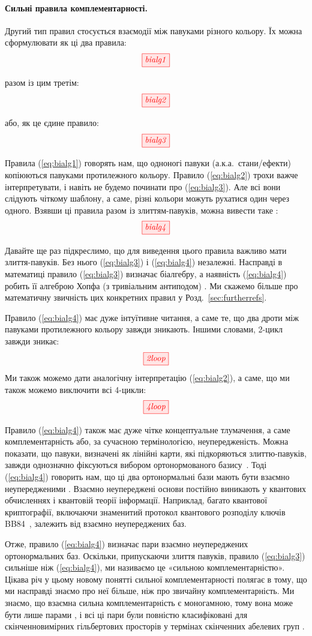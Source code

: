 \documentclass[11pt]{article}
\theoremstyle{definition}
\newcommand{\beq}{\begin{equation}}
\newcommand{\eeq}{\end{equation}\par\noindent}
\begin{document}
\paragraph{Сильні правила комплементарності.}  Другий тип правил стосується взаємодії між павуками різного кольору.
Їх можна сформулювати як ці два правила:  
\beq\label{eq:bialg1}
\tikzfig{bialg1} 
\eeq
разом із цим третім:
\beq\label{eq:bialg2}
\tikzfig{bialg2} 
\eeq 
або, як це єдине правило:
\beq\label{eq:bialg3}
\tikzfig{bialg3} 
\eeq
Правила (\ref{eq:bialg1}) говорять нам, що одноногі павуки (а.к.а.~стани/ефекти) копіюються павуками протилежного кольору. Правило (\ref{eq:bialg2}) трохи важче інтерпретувати, і навіть не будемо починати про (\ref{eq:bialg3}).
Але всі вони слідують чіткому шаблону, а саме, різні кольори можуть рухатися один через одного. Взявши ці правила разом із злиттям-павуків, можна вивести таке \cite{CD2}:
\beq\label{eq:bialg4}
\tikzfig{bialg4} 
\eeq
Давайте ще раз підкреслимо, що для виведення цього правила важливо мати злиття-павуків. Без нього (\ref{eq:bialg3}) і (\ref{eq:bialg4}) незалежні. Насправді в математиці правило (\ref{eq:bialg3}) визначає біалгебру, а наявність (\ref{eq:bialg4}) робить її алгеброю Хопфа (з тривіальним антиподом) \cite{cartier2007primer}. Ми скажемо більше про математичну звичність цих конкретних правил у Розд.~\ref{sec:furtherrefs}. 

Правило (\ref{eq:bialg4}) має дуже інтуїтивне читання, а саме те, що два дроти між павуками протилежного кольору завжди зникають. Іншими словами, 2-цикл завжди зникає:
\[ 
\tikzfig{2loop}
\]
Ми також можемо дати аналогічну інтерпретацію (\ref{eq:bialg2}), а саме, що ми також можемо виключити всі 4-цикли:
\[ 
\tikzfig{4loop}
\]

Правило (\ref{eq:bialg4}) також має дуже чітке концептуальне тлумачення, а саме комплементарність або, за сучасною термінологією, неупередженість. Можна показати, що павуки, визначені як лінійні карти, які підкоряються злиттю-павуків, завжди однозначно фіксуються вибором ортонормованого базису~\cite{CPV}. Тоді (\ref{eq:bialg4}) говорить нам, що ці два ортонормальні бази мають бути взаємно неупередженими \cite{CD2, CKbook}. Взаємно неупереджені основи постійно виникають у квантових обчисленнях і квантовій теорії інформації. Наприклад, багато квантової криптографії, включаючи знаменитий протокол квантового розподілу ключів BB84~\cite{BB84}, залежить від взаємно неупереджених баз.

Отже, правило (\ref{eq:bialg4}) визначає пари взаємно неупереджених ортонормальних баз. Оскільки, припускаючи злиття павуків, правило (\ref{eq:bialg3}) сильніше ніж (\ref{eq:bialg4}), ми називаємо це «сильною комплементарністю». Цікава річ у цьому новому понятті сильної комплементарності полягає в тому, що ми насправді знаємо про неї більше, ніж про звичайну комплементарність. Ми знаємо, що взаємна сильна комплементарність є моногамною, тому вона може бути лише парами \cite[Thm.~9.66]{CKbook}, і всі ці пари були повністю класифіковані для скінченновимірних гільбертових просторів у термінах скінченних абелевих груп \cite{CDKZ}.
\end{document}
